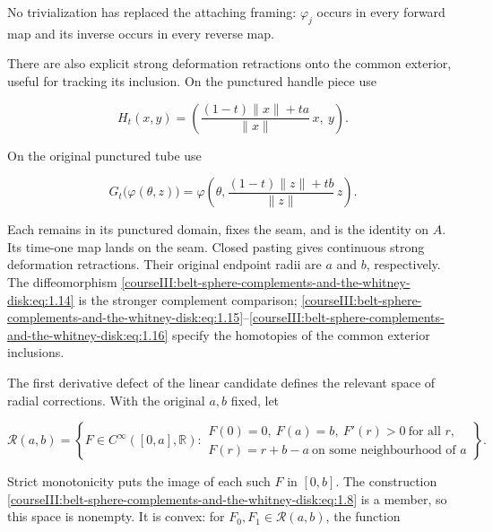 No trivialization has replaced the attaching framing: \(\varphi_j\) occurs in every forward map and its inverse occurs in every reverse map.

There are also explicit strong deformation retractions onto the common exterior, useful for tracking its inclusion. On the punctured handle piece use

\begin{equation}
H_t(x,y)=
\left(\frac{(1-t)\|x\|+ta}{\|x\|}\,x,\ y\right).
\label{courseIII:belt-sphere-complements-and-the-whitney-disk:eq:1.15}
\end{equation}

On the original punctured tube use

\begin{equation}
G_t\bigl(\varphi(\theta,z)\bigr)
=\varphi\left(\theta,
\frac{(1-t)\|z\|+tb}{\|z\|}\,z\right).
\label{courseIII:belt-sphere-complements-and-the-whitney-disk:eq:1.16}
\end{equation}

Each remains in its punctured domain, fixes the seam, and is the identity on \(A\). Its time-one map lands on the seam. Closed pasting gives continuous strong deformation retractions. Their original endpoint radii are \(a\) and \(b\), respectively. The diffeomorphism \eqref{courseIII:belt-sphere-complements-and-the-whitney-disk:eq:1.14} is the stronger complement comparison; \eqref{courseIII:belt-sphere-complements-and-the-whitney-disk:eq:1.15}--\eqref{courseIII:belt-sphere-complements-and-the-whitney-disk:eq:1.16} specify the homotopies of the common exterior inclusions.

The first derivative defect of the linear candidate defines the relevant space of radial corrections. With the original \(a,b\) fixed, let

\begin{equation}
\mathcal R(a,b)=
\left\{F\in C^\infty([0,a],\mathbb R):
\begin{array}{l}
F(0)=0,\ F(a)=b,\ F'(r)>0\ \text{for all }r,\\
F(r)=r+b-a\ \text{on some neighbourhood of }a
\end{array}
\right\}.
\label{courseIII:belt-sphere-complements-and-the-whitney-disk:eq:1.17}
\end{equation}

Strict monotonicity puts the image of each such \(F\) in \([0,b]\). The construction \eqref{courseIII:belt-sphere-complements-and-the-whitney-disk:eq:1.8} is a member, so this space is nonempty. It is convex: for \(F_0,F_1\in\mathcal R(a,b)\), the function

